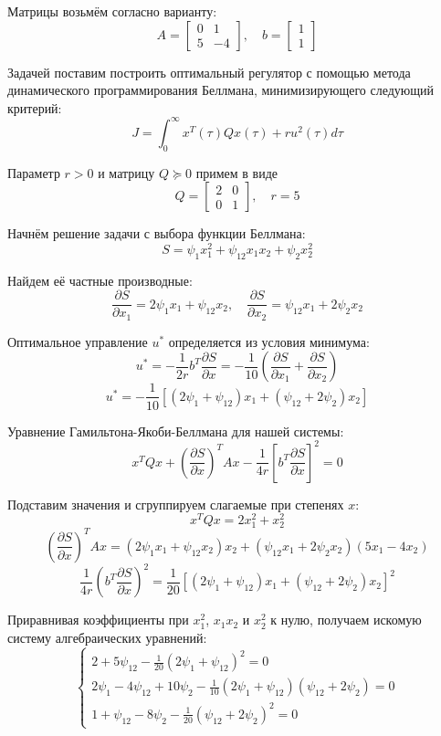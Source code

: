 \documentclass[a4paper,hidelinks,14pt]{extarticle}
\begin{document}
	Матрицы возьмём согласно варианту:
	\[
		A = \begin{bmatrix}
			0 & 1 \\
			5 & -4
		\end{bmatrix}, \quad
		b = \begin{bmatrix}
			1 \\
			1
		\end{bmatrix}
	\]

	Задачей поставим построить оптимальный регулятор с помощью метода динамического программирования Беллмана, минимизирующего следующий критерий:
	\[
		J = \int_{0}^{\infty}x^T(\tau) Q x(\tau) + r u^2(\tau) d \tau
	\]

	Параметр $r > 0$ и матрицу $Q \succcurlyeq 0$ примем в виде
	\[
		Q = \begin{bmatrix}
			2 & 0 \\
			0 & 1
		\end{bmatrix}, \quad
		r = 5
	\]

	Начнём решение задачи с выбора функции Беллмана:
	\[
		S = \psi_1 x_1^2 + \psi_{12} x_1 x_2 + \psi_2 x_2^2
	\]

	Найдем её частные производные:
	\[
		\frac{\partial S}{\partial x_1} = 2\psi_1 x_1 + \psi_{12} x_2, \quad
		\frac{\partial S}{\partial x_2} = \psi_{12} x_1 + 2\psi_2 x_2
	\]

	Оптимальное управление $u^*$ определяется из условия минимума:
	\[
		u^* = -\frac{1}{2r} b^T \frac{\partial S}{\partial x} = -\frac{1}{10} \left( \frac{\partial S}{\partial x_1} + \frac{\partial S}{\partial x_2} \right)
	\]
	\[
		u^* = -\frac{1}{10} \left[ (2\psi_1 + \psi_{12})x_1 + (\psi_{12} + 2\psi_2)x_2 \right]
	\]

	Уравнение Гамильтона-Якоби-Беллмана для нашей системы:
	\[
		x^T Q x + \left(\frac{\partial S}{\partial x}\right)^T Ax - \frac{1}{4r} \left[ b^T \frac{\partial S}{\partial x} \right]^2 = 0
	\]

	Подставим значения и сгруппируем слагаемые при степенях $x$:
	\[ x^T Q x = 2x_1^2 + x_2^2 \]
	\[
		\left(\frac{\partial S}{\partial x}\right)^TAx = (2\psi_1 x_1 + \psi_{12} x_2)x_2 + (\psi_{12} x_1 + 2\psi_2 x_2)(5x_1 - 4x_2)
	\]
	\[
		\frac{1}{4r} \left( b^T \frac{\partial S}{\partial x} \right)^2 = \frac{1}{20} \left[ (2\psi_1 + \psi_{12})x_1 + (\psi_{12} + 2\psi_2)x_2 \right]^2
	\]

	Приравнивая коэффициенты при $x_1^2$, $x_1 x_2$ и $x_2^2$ к нулю, получаем искомую систему алгебраических уравнений:
	\[
	\begin{cases}
		2 + 5\psi_{12} - \frac{1}{20}(2\psi_1 + \psi_{12})^2 = 0 \\[10pt]
		2\psi_1 - 4\psi_{12} + 10\psi_2 - \frac{1}{10}(2\psi_1 + \psi_{12})(\psi_{12} + 2\psi_2) = 0 \\[10pt]
		1 + \psi_{12} - 8\psi_2 - \frac{1}{20}(\psi_{12} + 2\psi_2)^2 = 0
	\end{cases}
	\]
\end{document}
